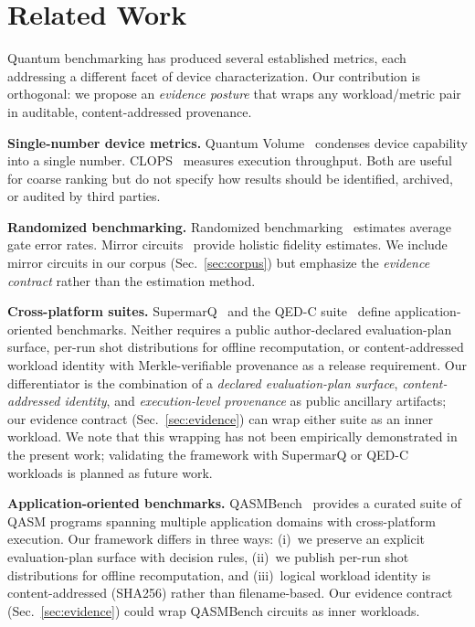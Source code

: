 \documentclass[aps,prxquantum,twocolumn,superscriptaddress,amsmath,amssymb,longbibliography,floatfix]{revtex4-2}
\begin{document}
\section{Related Work}
\label{sec:related}

Quantum benchmarking has produced several established metrics, each addressing a different facet of device characterization. Our contribution is orthogonal: we propose an \emph{evidence posture} that wraps any workload/metric pair in auditable, content-addressed provenance.

\textbf{Single-number device metrics.} Quantum Volume~\cite{Cross2019} condenses device capability into a single number. CLOPS~\cite{Wack2021} measures execution throughput. Both are useful for coarse ranking but do not specify how results should be identified, archived, or audited by third parties.

\textbf{Randomized benchmarking.} Randomized benchmarking~\cite{Emerson2005,Knill2008,Magesan2011} estimates average gate error rates. Mirror circuits~\cite{Proctor2021} provide holistic fidelity estimates. We include mirror circuits in our corpus (Sec.~\ref{sec:corpus}) but emphasize the \emph{evidence contract} rather than the estimation method.

\textbf{Cross-platform suites.} SupermarQ~\cite{Tomesh2022} and the QED-C suite~\cite{Lubinski2023} define application-oriented benchmarks. Neither requires a public author-declared evaluation-plan surface, per-run shot distributions for offline recomputation, or content-addressed workload identity with Merkle-verifiable provenance as a release requirement. Our differentiator is the combination of a \emph{declared evaluation-plan surface}, \emph{content-addressed identity}, and \emph{execution-level provenance} as public ancillary artifacts; our evidence contract (Sec.~\ref{sec:evidence}) can wrap either suite as an inner workload. We note that this wrapping has not been empirically demonstrated in the present work; validating the framework with SupermarQ or QED-C workloads is planned as future work.

\textbf{Application-oriented benchmarks.} QASMBench~\cite{Li2022qasmbench} provides a curated suite of QASM programs spanning multiple application domains with cross-platform execution. Our framework differs in three ways: (i)~we preserve an explicit evaluation-plan surface with decision rules, (ii)~we publish per-run shot distributions for offline recomputation, and (iii)~logical workload identity is content-addressed (SHA256) rather than filename-based. Our evidence contract (Sec.~\ref{sec:evidence}) could wrap QASMBench circuits as inner workloads.
\end{document}
